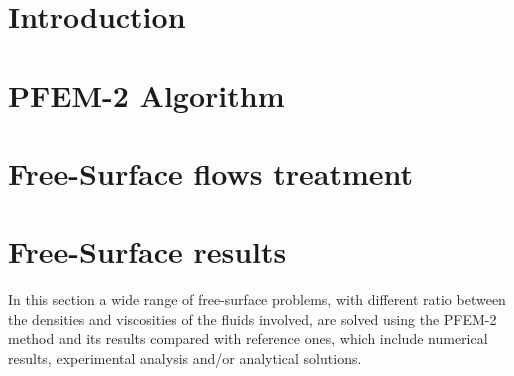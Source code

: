 \documentclass[review]{elsarticle}
\begin{document}
\linenumbers
\fboxsep=0mm%

\section{Introduction}\label{Intro}



\section{PFEM-2 Algorithm}\label{PFEM_Algorithm}


\section{Free-Surface flows treatment}\label{Free_surface}



% 

\section{Free-Surface results}\label{FS_results}

In this section a wide range of free-surface problems, with different ratio between the densities and viscosities of the fluids involved, are solved using the PFEM-2 method and its results compared with reference ones, which include numerical results, experimental analysis and/or analytical solutions.
\end{document}
